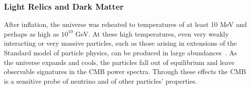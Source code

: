 
\vspace{-0.15in}

\subsubsection{Light Relics and Dark Matter}

\vspace{-0.05in}

After inflation, the universe was reheated to temperatures of at least 10 MeV and perhaps as high as $10^{10}$ GeV.  
At these high temperatures, even very weakly interacting or very massive particles, such as those arising 
in extensions of the Standard model of particle physics, can be produced in large abundances~\cite{1979ARNPS..29..313S,Bolz:2000fu}.  As the universe expands and cools, 
the particles fall out of equilibrium and leave observable signatures in the \ac{CMB} power spectra. 
Through these effects the CMB is a sensitive probe of neutrino and of other particles' properties.  

